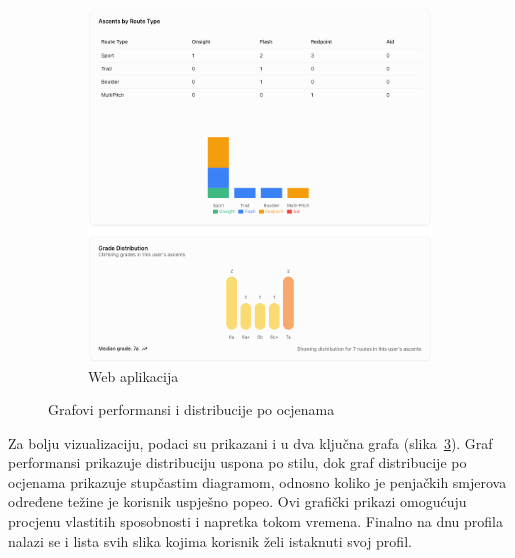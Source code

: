 \begin{figure}[H]
\begin{subfigure}[b]{0.3\textwidth}
\label{fig:korisnicki_profil_graf_mob}
    \end{subfigure}
    \hfill
    \begin{subfigure}[b]{0.65\textwidth}
        \centering
        \includegraphics[width=\textwidth]{images/implementacija/web/user-profile-2.png}
        \caption{Web aplikacija}
        \label{fig:korisnicki_profil_graf_web}
    \end{subfigure}
    \caption{Grafovi performansi i distribucije po ocjenama}
    \label{fig:korisnicki_profil_2}
\end{figure}

Za bolju vizualizaciju, podaci su prikazani i u dva ključna grafa (slika~\ref{fig:korisnicki_profil_2}). Graf performansi prikazuje distribuciju uspona po stilu, dok graf distribucije po ocjenama prikazuje stupčastim diagramom, odnosno koliko je penjačkih smjerova određene težine je korisnik uspješno popeo. Ovi grafički prikazi omogućuju procjenu vlastitih sposobnosti i napretka tokom vremena. Finalno na dnu profila nalazi se i lista svih slika kojima korisnik želi istaknuti svoj profil.

